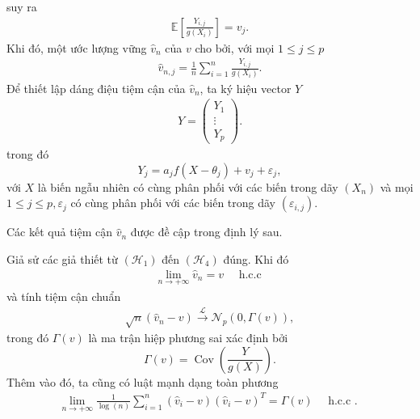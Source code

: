 suy ra 
$$
\begin{aligned}
\mathbb{E}\left[\frac{Y_{i, j}}{g\left(X_i\right)}\right] = v_j.
\end{aligned}
$$
Khi đó, một ước lượng vững $\widehat{v}_{n}$ của $v$ cho bởi, với mọi $1 \leq j \leq p$
\begin{align}
    \widehat{v}_{n, j}=\frac{1}{n} \sum_{i=1}^{n} \frac{Y_{i, j}}{g\left(X_{i}\right)}.
    \label{3.1}
\end{align}
Để thiết lập dáng điệu tiệm cận của $\widehat{v}_{n}$, ta ký hiệu vector $Y$ 
\begin{align}
    Y=\left(\begin{array}{c}
Y_{1} \\
\vdots \\
Y_{p}
\end{array}\right) .
\label{3.2}
\end{align}
trong đó
$$
Y_{j}=a_{j} f\left(X-\theta_{j}\right)+v_{j}+\varepsilon_{j},
$$
với $X$ là biến ngẫu nhiên có cùng phân phối với các biến trong dãy $\left(X_{n}\right)$ và mọi $1 \leq j \leq p, \varepsilon_{j}$ có cùng phân phối với các biến trong dãy $\left(\varepsilon_{i, j}\right)$.

Các kết quả tiệm cận $\widehat{v}_{n}$ được đề cập trong định lý sau.

{\dl Giả sử các giả thiết từ $\left(\mathcal{H}_{1}\right)$ đến $\left(\mathcal{H}_{4}\right)$ đúng. Khi đó
\begin{align}
    \lim _{n \rightarrow+\infty} \widehat{v}_{n}=v \quad \text { h.c.c }
    \label{3.3}
\end{align}
và tính tiệm cận chuẩn
\begin{align}
    \sqrt{n}\left(\widehat{v}_{n}-v\right) \stackrel{\mathcal{L}}{\longrightarrow} \mathcal{N}_{p}(0, \Gamma(v)),
    \label{3.4}
\end{align}
trong đó $\Gamma(v)$ là ma trận hiệp phương sai xác định bởi
$$
\Gamma(v)=\operatorname{Cov}\left(\frac{Y}{g(X)}\right).
$$
Thêm vào đó, ta cũng có luật mạnh dạng toàn phương
\begin{align}
    \lim _{n \rightarrow+\infty} \frac{1}{\log (n)} \sum_{i=1}^{n}\left(\widehat{v}_{i}-v\right)\left(\widehat{v}_{i}-v\right)^{T}=\Gamma(v) \quad \text { h.c.c . }
    \label{3.5}
\end{align}}

